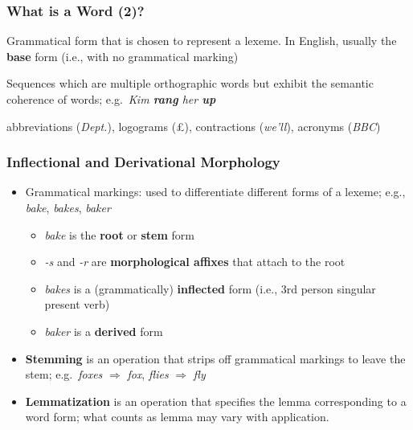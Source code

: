 \begin{frame}[fragile]
  \frametitle{What is a Word (2)?}

    \begin{description}[<+->]
      \item[Lemma/Citation Form:] Grammatical form that is chosen to
        represent a lexeme. In English, usually the \textbf{base} form
        (i.e., with no grammatical marking)

      \item[Multi-part/Discontinuous Words:] Sequences which are
        multiple orthographic words but exhibit the semantic coherence
        of words; e.g.\ \textit{Kim
          \textbf{rang} her \textbf{up}}

        \item[Short Forms:] abbreviations (\textit{Dept.}), logograms
        (\pounds), contractions (\textit{we'll}), acronyms (\textit{BBC})
    \end{description}
 
\end{frame}

\begin{frame}[fragile]
  \frametitle{Inflectional and Derivational Morphology}

  \begin{itemize}[<+->]
    \item Grammatical markings: used to differentiate different forms
      of a lexeme; e.g., \textit{bake}, \textit{bakes}, \textit{baker}
 

      \begin{itemize}
      \item \textit{bake} is the \textbf{root} or \textbf{stem}
        form
      \item \textit{-s} and \textit{-r} are \textbf{morphological
          affixes} that attach to the root
      \item \textit{bakes} is a (grammatically) \textbf{inflected}
        form (i.e., 3rd person singular present verb)
      \item \textit{baker} is a \textbf{derived} form
      \end{itemize}

    \item \textbf{Stemming} is an operation that strips off
      grammatical markings to leave the stem; e.g.\ \textit{foxes}
      $\Rightarrow$ \textit{fox},  \textit{flies}
      $\Rightarrow$ \textit{fly}

    \item \textbf{Lemmatization} is an operation that specifies the
      lemma corresponding to a word form; what counts as lemma may
      vary with application.
    \end{itemize}
\end{frame}

